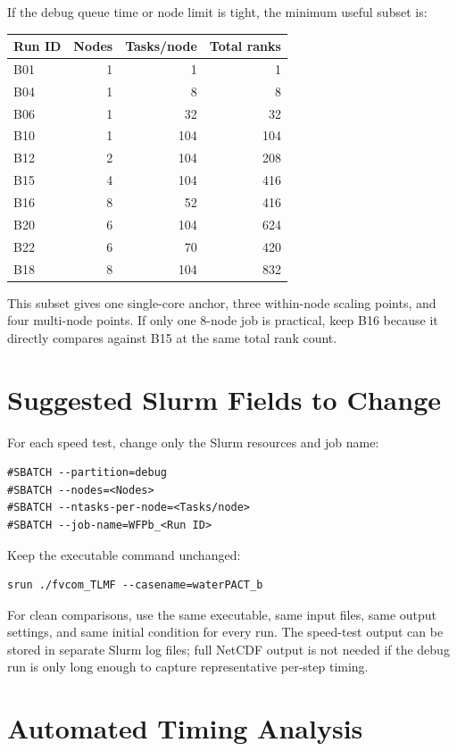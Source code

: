 \documentclass[11pt]{article}
\begin{document}
If the debug queue time or node limit is tight, the minimum useful subset is:
\begin{center}
\begin{tabular}{lrrr}
\toprule
Run ID & Nodes & Tasks/node & Total ranks \\
\midrule
B01 & 1 & 1 & 1 \\
B04 & 1 & 8 & 8 \\
B06 & 1 & 32 & 32 \\
B10 & 1 & 104 & 104 \\
B12 & 2 & 104 & 208 \\
B15 & 4 & 104 & 416 \\
B16 & 8 & 52 & 416 \\
B20 & 6 & 104 & 624 \\
B22 & 6 & 70 & 420 \\
B18 & 8 & 104 & 832 \\
\bottomrule
\end{tabular}
\end{center}

This subset gives one single-core anchor, three within-node scaling points, and
four multi-node points.  If only one 8-node job is practical, keep B16 because
it directly compares against B15 at the same total rank count.

\section*{Suggested Slurm Fields to Change}

For each speed test, change only the Slurm resources and job name:
\begin{verbatim}
#SBATCH --partition=debug
#SBATCH --nodes=<Nodes>
#SBATCH --ntasks-per-node=<Tasks/node>
#SBATCH --job-name=WFPb_<Run ID>
\end{verbatim}

Keep the executable command unchanged:
\begin{verbatim}
srun ./fvcom_TLMF --casename=waterPACT_b
\end{verbatim}

For clean comparisons, use the same executable, same input files, same output
settings, and same initial condition for every run.  The speed-test output can
be stored in separate Slurm log files; full NetCDF output is not needed if the
debug run is only long enough to capture representative per-step timing.

\section*{Automated Timing Analysis}
\end{document}
